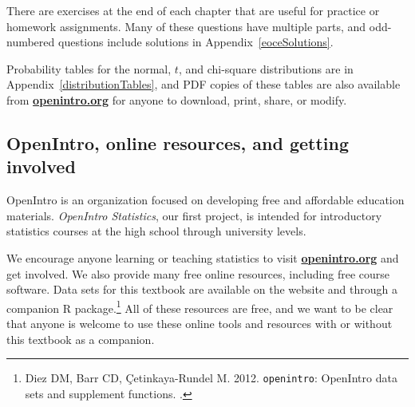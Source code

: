 There are exercises at the end of each chapter that are useful for practice or homework assignments. Many of these questions have multiple parts, and odd-numbered questions include solutions in Appendix~\ref{eoceSolutions}. %

Probability tables for the normal, $t$, and chi-square distributions are in Appendix~\ref{distributionTables}, and PDF copies of these tables are also available from \href{http://www.openintro.org}{\color{black}\textbf{openintro.org}} for anyone to download, print, share, or modify.

\subsection*{OpenIntro, online resources, and getting involved}

OpenIntro is an organization focused on developing free and affordable education materials. \emph{OpenIntro Statistics}, our first project, is intended for introductory statistics courses at the high school through university levels.


We encourage anyone learning or teaching statistics to visit \href{http://www.openintro.org}{\color{black}\textbf{openintro.org}} and get involved. We also provide many free online resources, including free course software. 
Data sets for this textbook are available on the website and through a companion R package.\footnote{Diez DM, Barr CD, \c{C}etinkaya-Rundel M. 2012. \texttt{openintro}: OpenIntro data sets and supplement functions. .} All of these resources are free, and we want to be clear that anyone is welcome to use these online tools and resources with or without this textbook as a companion.

